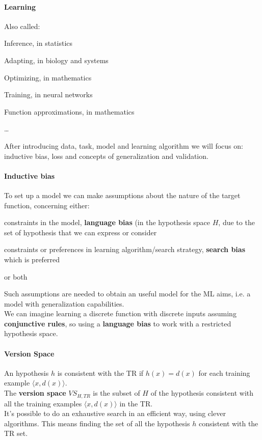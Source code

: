 \documentclass[10pt]{report}
\begin{document}
\paragraph{Learning} Also called:
\begin{list}{}{}
	\item Inference, in statistics
	\item Adapting, in biology and systems
	\item Optimizing, in mathematics
	\item Training, in neural networks
	\item Function approximations, in mathematics
	\item \ldots
\end{list}
After introducing data, task, model and learning algorithm we will focus on: inductive bias, loss and concepts of generalization and validation.
\paragraph{Inductive bias} To set up a model we can make assumptions about the nature of the target function, concerning either:
\begin{list}{}{}
	\item constraints in the model, \textbf{language bias} (in the hypothesis space $H$, due to the set of hypothesis that we can express or consider
	\item constraints or preferences in learning algorithm/search strategy, \textbf{search bias} which is preferred
	\item or both
\end{list}
Such assumptions are needed to obtain an useful model for the ML aims, i.e. a model with generalization capabilities.\\
We can imagine learning a discrete function with discrete inputs assuming \textbf{conjunctive rules}, so using a \textbf{language bias} to work with a restricted hypothesis space.
\paragraph{Version Space} An hypothesis $h$ is consistent with the TR if $h(x) = d(x)$ for each training example $\langle x, d(x)\rangle$.\\
The \textbf{version space} $VS_{H, TR}$ is the subset of $H$ of the hypothesis consistent with all the training examples $\langle x, d(x)\rangle$ in the TR.\\
It's possible to do an exhaustive search in an efficient way, using clever algorithms. This means finding the set of all the hypothesis $h$ consistent with the TR set. 
\end{document}
